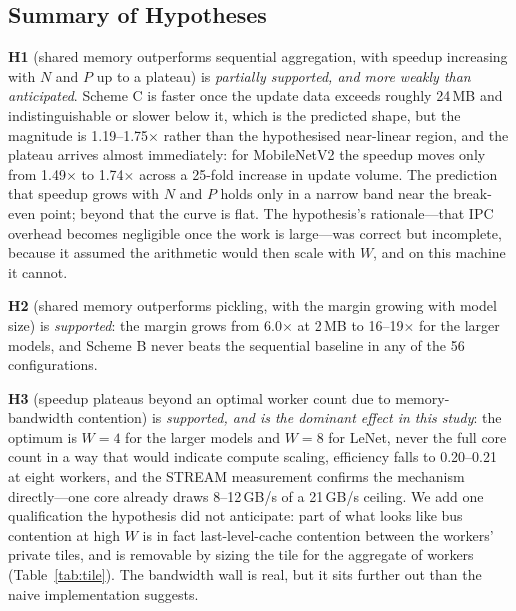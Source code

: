 \documentclass[conference]{IEEEtran}
\begin{document}
\subsection{Summary of Hypotheses}
\textbf{H1} (shared memory outperforms sequential aggregation, with speedup increasing with $N$ and $P$ up to a plateau) is \emph{partially supported, and more weakly than anticipated}. Scheme C is faster once the update data exceeds roughly 24\,MB and indistinguishable or slower below it, which is the predicted shape, but the magnitude is 1.19--1.75$\times$ rather than the hypothesised near-linear region, and the plateau arrives almost immediately: for MobileNetV2 the speedup moves only from 1.49$\times$ to 1.74$\times$ across a 25-fold increase in update volume. The prediction that speedup grows with $N$ and $P$ holds only in a narrow band near the break-even point; beyond that the curve is flat. The hypothesis's rationale---that IPC overhead becomes negligible once the work is large---was correct but incomplete, because it assumed the arithmetic would then scale with $W$, and on this machine it cannot.

\textbf{H2} (shared memory outperforms pickling, with the margin growing with model size) is \emph{supported}: the margin grows from 6.0$\times$ at 2\,MB to 16--19$\times$ for the larger models, and Scheme B never beats the sequential baseline in any of the 56 configurations.

\textbf{H3} (speedup plateaus beyond an optimal worker count due to memory-bandwidth contention) is \emph{supported, and is the dominant effect in this study}: the optimum is $W=4$ for the larger models and $W=8$ for LeNet, never the full core count in a way that would indicate compute scaling, efficiency falls to 0.20--0.21 at eight workers, and the STREAM measurement confirms the mechanism directly---one core already draws 8--12\,GB/s of a 21\,GB/s ceiling. We add one qualification the hypothesis did not anticipate: part of what looks like bus contention at high $W$ is in fact last-level-cache contention between the workers' private tiles, and is removable by sizing the tile for the aggregate of workers (Table~\ref{tab:tile}). The bandwidth wall is real, but it sits further out than the naive implementation suggests.
\end{document}
